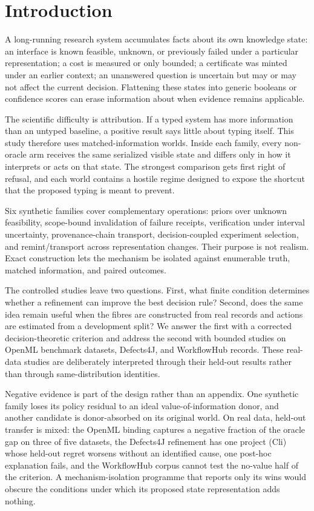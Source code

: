 \section{Introduction}

A long-running research system accumulates facts about its own knowledge state: an interface is known feasible, unknown, or previously failed under a particular representation; a cost is measured or only bounded; a certificate was minted under an earlier context; an unanswered question is uncertain but may or may not affect the current decision. Flattening these states into generic booleans or confidence scores can erase information about when evidence remains applicable.

The scientific difficulty is attribution. If a typed system has more information than an untyped baseline, a positive result says little about typing itself. This study therefore uses matched-information worlds. Inside each family, every non-oracle arm receives the same serialized visible state and differs only in how it interprets or acts on that state. The strongest comparison gets first right of refusal, and each world contains a hostile regime designed to expose the shortcut that the proposed typing is meant to prevent.

Six synthetic families cover complementary operations: priors over unknown feasibility, scope-bound invalidation of failure receipts, verification under interval uncertainty, provenance-chain transport, decision-coupled experiment selection, and remint/transport across representation changes. Their purpose is not realism. Exact construction lets the mechanism be isolated against enumerable truth, matched information, and paired outcomes.

The controlled studies leave two questions. First, what finite condition determines whether a refinement can improve the best decision rule? Second, does the same idea remain useful when the fibres are constructed from real records and actions are estimated from a development split? We answer the first with a corrected decision-theoretic criterion and address the second with bounded studies on OpenML benchmark datasets, Defects4J, and WorkflowHub records. These real-data studies are deliberately interpreted through their held-out results rather than through same-distribution identities.

Negative evidence is part of the design rather than an appendix. One synthetic family loses its policy residual to an ideal value-of-information donor, and another candidate is donor-absorbed on its original world. On real data, held-out transfer is mixed: the OpenML binding captures a negative fraction of the oracle gap on three of five datasets, the Defects4J refinement has one project (Cli) whose held-out regret worsens without an identified cause, one post-hoc explanation fails, and the WorkflowHub corpus cannot test the no-value half of the criterion. A mechanism-isolation programme that reports only its wins would obscure the conditions under which its proposed state representation adds nothing.
